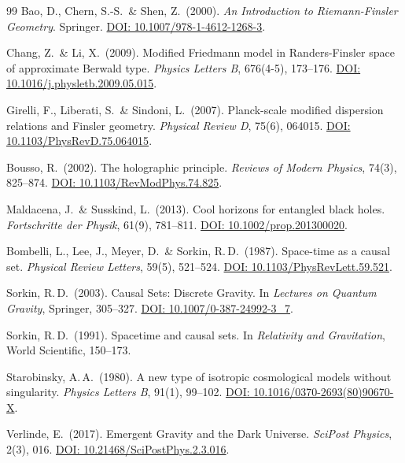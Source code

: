 \documentclass[aps,prd,twocolumn,superscriptaddress,nofootinbib]{revtex4-2}
\begin{document}
\begin{thebibliography}{99}
Bao, D., Chern, S.-S.\ \& Shen, Z.\ (2000).
\textit{An Introduction to Riemann-Finsler Geometry}. Springer.
\href{https://doi.org/10.1007/978-1-4612-1268-3}{DOI: 10.1007/978-1-4612-1268-3}.

Chang, Z.\ \& Li, X.\ (2009).
Modified Friedmann model in Randers-Finsler space of approximate Berwald type.
\textit{Physics Letters B}, 676(4-5), 173--176.
\href{https://doi.org/10.1016/j.physletb.2009.05.015}{DOI: 10.1016/j.physletb.2009.05.015}.

Girelli, F., Liberati, S.\ \& Sindoni, L.\ (2007).
Planck-scale modified dispersion relations and Finsler geometry.
\textit{Physical Review D}, 75(6), 064015.
\href{https://doi.org/10.1103/PhysRevD.75.064015}{DOI: 10.1103/PhysRevD.75.064015}.

Bousso, R.\ (2002).
The holographic principle.
\textit{Reviews of Modern Physics}, 74(3), 825--874.
\href{https://doi.org/10.1103/RevModPhys.74.825}{DOI: 10.1103/RevModPhys.74.825}.

Maldacena, J.\ \& Susskind, L.\ (2013).
Cool horizons for entangled black holes.
\textit{Fortschritte der Physik}, 61(9), 781--811.
\href{https://doi.org/10.1002/prop.201300020}{DOI: 10.1002/prop.201300020}.

Bombelli, L., Lee, J., Meyer, D.\ \& Sorkin, R.\,D.\ (1987).
Space-time as a causal set.
\textit{Physical Review Letters}, 59(5), 521--524.
\href{https://doi.org/10.1103/PhysRevLett.59.521}{DOI: 10.1103/PhysRevLett.59.521}.

Sorkin, R.\,D.\ (2003).
Causal Sets: Discrete Gravity.
In \textit{Lectures on Quantum Gravity}, Springer, 305--327.
\href{https://doi.org/10.1007/0-387-24992-3_7}{DOI: 10.1007/0-387-24992-3\_7}.

Sorkin, R.\,D.\ (1991).
Spacetime and causal sets.
In \textit{Relativity and Gravitation}, World Scientific, 150--173.

Starobinsky, A.\,A.\ (1980).
A new type of isotropic cosmological models without singularity.
\textit{Physics Letters B}, 91(1), 99--102.
\href{https://doi.org/10.1016/0370-2693(80)90670-X}{DOI: 10.1016/0370-2693(80)90670-X}.

Verlinde, E.\ (2017).
Emergent Gravity and the Dark Universe.
\textit{SciPost Physics}, 2(3), 016.
\href{https://doi.org/10.21468/SciPostPhys.2.3.016}{DOI: 10.21468/SciPostPhys.2.3.016}.


\end{thebibliography}
\end{document}
